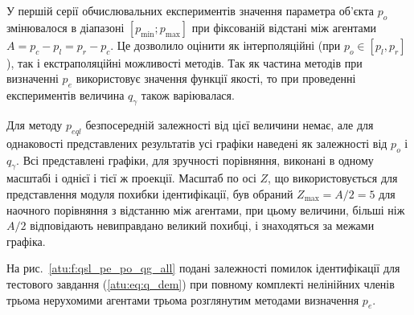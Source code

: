 У першій серії обчислювальних експериментів значення параметра об'єкта $p_o$
змінювалося в діапазоні $[p_{\min}; p_{\max}]$ при фіксованій відстані
між агентами $A = p_c - p_l = p_r - p_c$. Це дозволило оцінити як
інтерполяційні (при $p_o \in [p_l, p_r]$), так і екстраполяційні можливості
методів. Так як частина методів при визначенні $p_e$ використовує значення
функції якості, то при проведенні експериментів величина $q_\gamma$ також
варіювалася.

Для методу
$p_{eql}$ безпосередній залежності від цієї величини немає, але
для однаковості представлених результатів усі графіки наведені
як залежності від
$p_o$ і
$q_\gamma$. Всі представлені графіки, для зручності порівняння,
виконані в одному масштабі і однієї і тієї ж проекції. Масштаб
по осі
$Z$, що використовується для представлення модуля похибки
ідентифікації, був обраний
$Z_{\max} = A / 2 = 5$ для наочного порівняння з відстанню між агентами,
при цьому величини, більші ніж
$A/2$ відповідають невиправдано великий похибці, і знаходяться
за межами графіка.

На рис.~\ref{atu:f:qsl_pe_po_qg_all} подані залежності помилок
ідентифікації для тестового завдання (\ref{atu:eq:q_dem}) при повному
комплекті нелінійних членів  трьома нерухомими
агентами трьома розглянутим методами визначення $p_e$.


